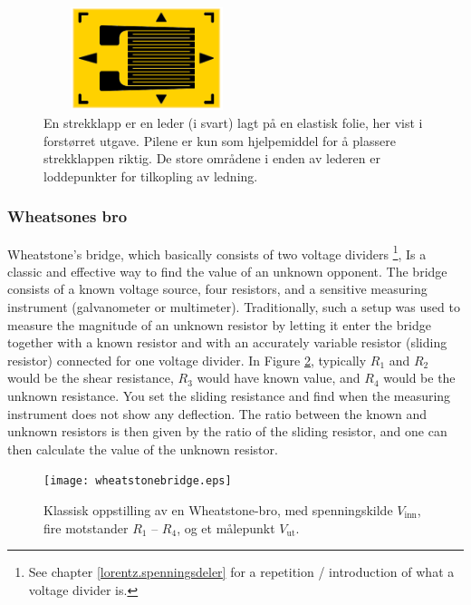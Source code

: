 \documentclass[../Elmag-labhefte-2022.tex]{subfiles}
\begin{document}
\begin{figure}[h!b]
    \centering
    \includegraphics[width=6.01cm,height=3cm,keepaspectratio]{fig/strekklapp.png}
    \caption{%
        En strekklapp er en leder (i svart) lagt på en elastisk folie, her vist i forstørret utgave. Pilene er kun som hjelpemiddel for å plassere strekklappen riktig. De store områdene i enden av lederen er loddepunkter for tilkopling av ledning.
    }   
    \label{fig:strekklapp}
\end{figure}


\subsubsection{Wheatsones bro} \vspace{-5mm}
Wheatstone's bridge, which basically consists of two voltage dividers \footnote{See chapter \ref{lorentz.spenningsdeler} for a repetition / introduction of what a voltage divider is.}, Is a classic and effective way to find the value of an unknown opponent. The bridge consists of a known voltage source, four resistors, and a sensitive measuring instrument (galvanometer or multimeter). Traditionally, such a setup was used to measure the magnitude of an unknown resistor by letting it enter the bridge together with a known resistor and with an accurately variable resistor (sliding resistor) connected for one voltage divider.
In Figure \ref{fig:wheatstonebridge}, typically $R_1$ and $R_2$ would be the shear resistance, $R_3$ would have known value, and $R_4$ would be the unknown resistance. You set the sliding resistance and find when the measuring instrument does not show any deflection. The ratio between the known and unknown resistors is then given by the ratio of the sliding resistor, and one can then calculate the value of the unknown resistor.


\begin{figure}[htbp]
    \centering
    \texttt{[image: wheatstonebridge.eps]}
    \caption{%
        Klassisk oppstilling av en Wheatstone-bro, med spenningskilde $V_\text{inn}$, fire motstander $R_1$ -- $R_4$, og et målepunkt $V_\text{ut}$.
    }
    \label{fig:wheatstonebridge}
\end{figure}
\end{document}
